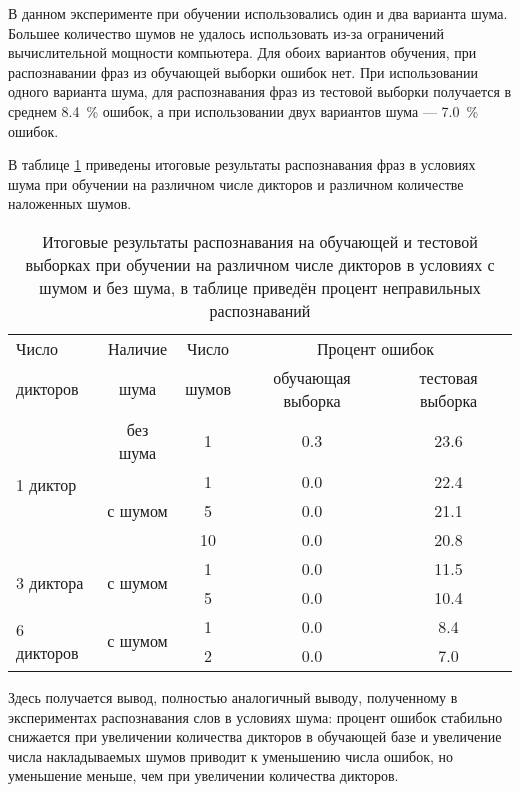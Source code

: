 В данном эксперименте при обучении использовались один и два варианта шума.
Большее количество шумов не удалось использовать из-за ограничений вычислительной мощности компьютера.
Для обоих вариантов обучения, при распознавании фраз из обучающей выборки ошибок нет.
При использовании одного варианта шума, для распознавания фраз из тестовой выборки получается в среднем 8.4~\% ошибок, а при использовании двух вариантов шума --- 7.0~\% ошибок.

В таблице \ref{tab:cnn_phrases_with_noise_summary} приведены итоговые результаты распознавания фраз в условиях шума при обучении на различном числе дикторов и различном количестве наложенных шумов.

\begin{table}[h]
	\centering
	\caption{Итоговые результаты распознавания на обучающей и тестовой выборках при обучении на различном числе дикторов в условиях с шумом и без шума, в таблице приведён процент неправильных распознаваний}
	\label{tab:cnn_phrases_with_noise_summary}
	\begin{tabular}{| l | c | c | c | c |}
		\hline
		Число				& \phantom{0}Наличие\phantom{0} & \phantom{0} Число \phantom{0} 	& \multicolumn{2}{c|}{Процент ошибок}	\\
		\hhline{~~~--}
		дикторов			& шума  			& шумов 	& обучающая выборка & тестовая выборка	\\
		\hline
		\multirow{4}{*}{1 диктор}	& без шума					& 1				& 0.3 		& 23.6 		\\
		\hhline{~----}
									& \multirow{3}{*}{с шумом}	& 1				& 0.0 		& 22.4  	\\
		\hhline{~~---}
									&							& 5				& 0.0 		& 21.1  	\\
		\hhline{~~---}
									&    						& 10			& 0.0 		& 20.8  	\\
		\hline
		\multirow{2}{*}{3 диктора}	& \multirow{2}{*}{с шумом}	& 1				& 0.0 		& 11.5  	\\
		\hhline{~~---}
									&    						& 5				& 0.0 		& 10.4  	\\
		\hline
		\multirow{2}{*}{6 дикторов}	& \multirow{2}{*}{с шумом}	& 1				& 0.0 		& 8.4  		\\
		\hhline{~~---}
									&    						& 2				& 0.0 		& 7.0  		\\
		\hline
	\end{tabular}
\end{table}

Здесь получается вывод, полностью аналогичный выводу, полученному в экспериментах распознавания слов в условиях шума: процент ошибок стабильно снижается при увеличении количества дикторов в обучающей базе и увеличение числа накладываемых шумов приводит к уменьшению числа ошибок, но уменьшение меньше, чем при увеличении количества дикторов.


